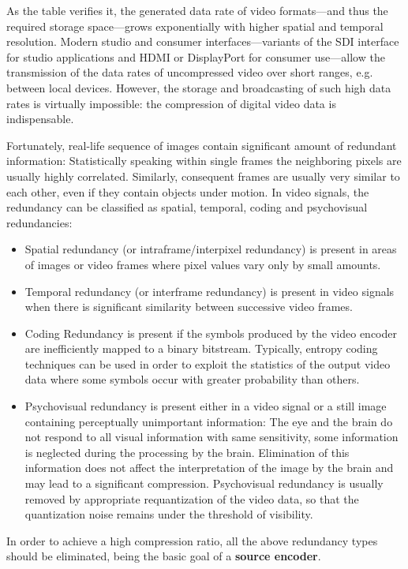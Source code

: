 As the table verifies it, the generated data rate of video formats---and thus the required storage space---grows exponentially with higher spatial and temporal resolution.
Modern studio and consumer interfaces---variants of the SDI interface for studio applications and HDMI or DisplayPort for consumer use---allow the transmission of the data rates of uncompressed video over short ranges, e.g. between local devices.
However, the storage and broadcasting of such high data rates is virtually impossible:
the compression of digital video data is indispensable.

\vspace{3mm}
Fortunately, real-life sequence of images contain significant amount of redundant information:
Statistically speaking within single frames the neighboring pixels are usually highly correlated.
Similarly, consequent frames are usually very similar to each other, even if they contain objects under motion.
In video signals, the redundancy can be classified as spatial, temporal, coding and psychovisual redundancies:
\begin{itemize}
\item Spatial redundancy (or intraframe/interpixel redundancy) is present in areas of images or video frames where pixel values vary only by small amounts.
\item Temporal redundancy (or interframe redundancy) is present in video signals when there is significant similarity between successive video frames.
\item Coding Redundancy is present if the symbols produced by the video encoder are inefficiently mapped to a binary bitstream. Typically, entropy coding techniques can be used in order to exploit the statistics of the output video data where some symbols occur with greater probability than others.
\item Psychovisual redundancy is present either in a video signal or a still image containing perceptually unimportant information:
The eye and the brain do not respond to all visual information with same sensitivity, some information is neglected during the processing by the brain. 
Elimination of this information does not affect the interpretation of the image by the brain and may lead to a significant compression.
Psychovisual redundancy is usually removed by appropriate requantization of the video data, so that the quantization noise remains under the threshold of visibility.
\end{itemize}
In order to achieve a high compression ratio, all the above redundancy types should be eliminated, being the basic goal of a 
\textbf{source encoder}.

